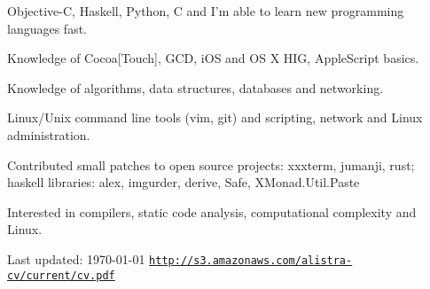 \documentclass[letterpaper]{article}
\renewenvironment{itemize}{
  \begin{list}{}{
    \setlength{\leftmargin}{1.5em}
  }
}{
  \end{list}
}
\begin{document}
\begin{itemize}
	\item Objective-C, Haskell, Python, C and I'm able to learn new programming languages fast.
	\item Knowledge of Cocoa[Touch], GCD, iOS and OS X HIG, AppleScript basics.
	\item Knowledge of algorithms, data structures, databases and networking.
    \item Linux/Unix command line tools (vim, git) and scripting, network and Linux administration.
	\item Contributed small patches to open source projects: xxxterm, jumanji, rust;\\
		 haskell libraries: alex, imgurder, derive, Safe, XMonad.Util.Paste
	\item Interested in compilers, static code analysis, computational complexity and Linux.
\end{itemize}

\bigskip

\begin{center}
  \begin{footnotesize}
    Last updated: \today
    \hfill
    \href{http://s3.amazonaws.com/alistra-cv/current/cv.pdf}
    {\texttt{http://s3.amazonaws.com/alistra-cv/current/cv.pdf}}
  \end{footnotesize}
\end{center}
\end{document}
